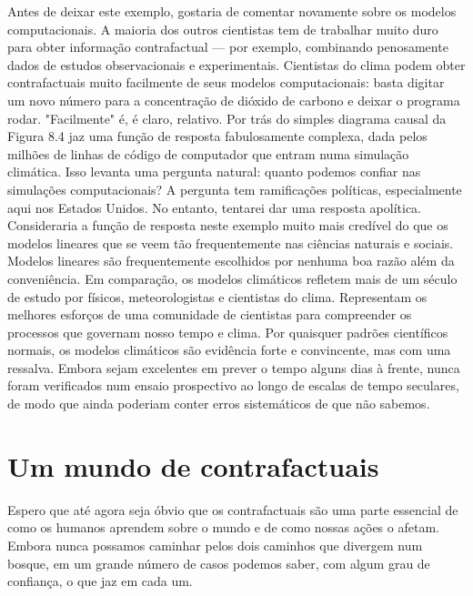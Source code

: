 \documentclass[11pt,a5paper,twoside]{book}
\begin{document}
Antes de deixar este exemplo, gostaria de comentar novamente sobre os modelos computacionais. A maioria dos outros cientistas tem de trabalhar muito duro para obter informação contrafactual — por exemplo, combinando penosamente dados de estudos observacionais e experimentais. Cientistas do clima podem obter contrafactuais muito facilmente de seus modelos computacionais: basta digitar um novo número para a concentração de dióxido de carbono e deixar o programa rodar. "Facilmente" é, é claro, relativo. Por trás do simples diagrama causal da Figura 8.4 jaz uma função de resposta fabulosamente complexa, dada pelos milhões de linhas de código de computador que entram numa simulação climática. Isso levanta uma pergunta natural: quanto podemos confiar nas simulações computacionais? A pergunta tem ramificações políticas, especialmente aqui nos Estados Unidos. No entanto, tentarei dar uma resposta apolítica. Consideraria a função de resposta neste exemplo muito mais credível do que os modelos lineares que se veem tão frequentemente nas ciências naturais e sociais. Modelos lineares são frequentemente escolhidos por nenhuma boa razão além da conveniência. Em comparação, os modelos climáticos refletem mais de um século de estudo por físicos, meteorologistas e cientistas do clima. Representam os melhores esforços de uma comunidade de cientistas para compreender os processos que governam nosso tempo e clima. Por quaisquer padrões científicos normais, os modelos climáticos são evidência forte e convincente, mas com uma ressalva. Embora sejam excelentes em prever o tempo alguns dias à frente, nunca foram verificados num ensaio prospectivo ao longo de escalas de tempo seculares, de modo que ainda poderiam conter erros sistemáticos de que não sabemos.

\section{Um mundo de contrafactuais}
Espero que até agora seja óbvio que os contrafactuais são uma parte essencial de como os humanos aprendem sobre o mundo e de como nossas ações o afetam. Embora nunca possamos caminhar pelos dois caminhos que divergem num bosque, em um grande número de casos podemos saber, com algum grau de confiança, o que jaz em cada um.
\end{document}
